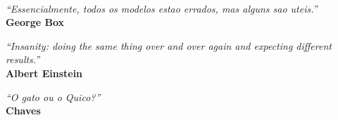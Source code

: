 \
\vfill

\begin{flushright}
\hfill \textit{``Essencialmente, todos os modelos estao errados, mas alguns sao uteis.''} \\
{\bf George Box}
\end{flushright}

\begin{flushright}
\hfill \textit{``Insanity: doing the same thing over and over again and expecting different results.''} \\
{\bf Albert Einstein}
\end{flushright}

\begin{flushright}
\hfill \textit{``O gato ou o Quico?''} \\
{\bf Chaves}
\end{flushright}

\vspace*{1cm}